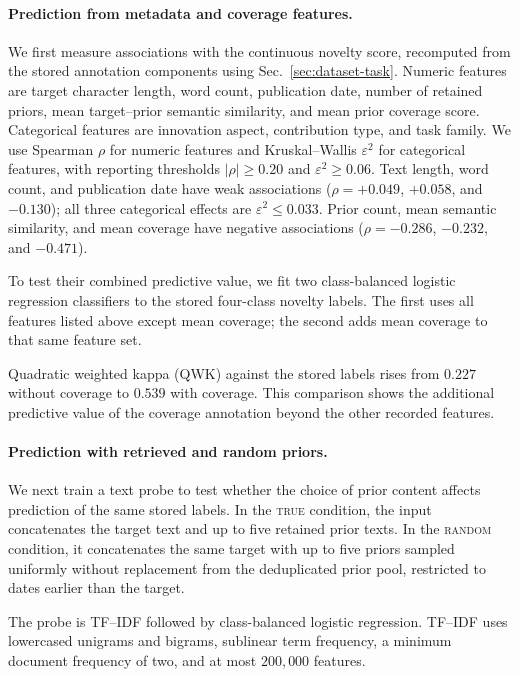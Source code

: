 \paragraph{Prediction from metadata and coverage features.}
We first measure associations with the continuous novelty score, recomputed
from the stored annotation components using Sec.~\ref{sec:dataset-task}.
Numeric features are target character length, word count, publication date,
number of retained priors, mean target--prior semantic
similarity, and mean prior coverage score. Categorical features are innovation
aspect, contribution type, and task family. We use Spearman $\rho$ for numeric
features and Kruskal--Wallis $\varepsilon^2$ for categorical features, with
reporting thresholds $|\rho|\ge0.20$ and $\varepsilon^2\ge0.06$.
Text length, word count, and publication date have weak associations
($\rho=+0.049$, $+0.058$, and $-0.130$); all three categorical effects are
$\varepsilon^2\le0.033$. Prior count, mean semantic similarity, and mean
coverage have negative associations ($\rho=-0.286$, $-0.232$, and $-0.471$).

To test their combined predictive value, we fit two class-balanced logistic
regression classifiers to the stored four-class novelty labels. The first uses
all features listed above except mean coverage; the second adds mean coverage
to that same feature set.

Quadratic weighted kappa (QWK) against the stored labels rises from $0.227$ without coverage to $0.539$ with coverage. This
comparison shows the additional predictive value of the coverage annotation
beyond the other recorded features.

\paragraph{Prediction with retrieved and random priors.}
We next train a text probe to test whether the choice of prior content affects
prediction of the same stored labels. In the \textsc{true} condition, the input
concatenates the target text and up to five retained prior texts. In the
\textsc{random} condition, it concatenates the same target with up to five
priors sampled uniformly without replacement from the deduplicated prior pool,
restricted to dates earlier than the target.

The probe is TF--IDF followed by class-balanced logistic regression. TF--IDF
uses lowercased unigrams and bigrams, sublinear term frequency, a minimum
document frequency of two, and at most $200{,}000$ features.

